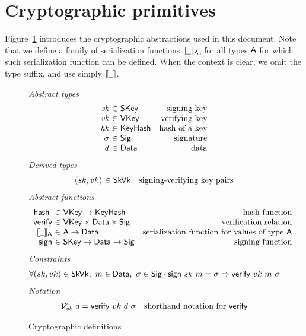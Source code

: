 \section{Cryptographic primitives}
\label{sec:crypto-primitives}

Figure~\ref{fig:crypto-defs} introduces the cryptographic abstractions used in
this document. Note that we define a family of serialization functions
$\serialised{\wcard}_\type{A}$, for all types $\mathsf{A}$ for which such
serialization function can be defined. When the context is clear, we omit the
type suffix, and use simply $\serialised{\wcard}$.

\begin{figure}[htb]
  \emph{Abstract types}
  \begin{equation*}
    \begin{array}{r@{~\in~}lr}
      \var{sk} & \SKey & \text{signing key}\\
      \var{vk} & \VKey & \text{verifying key}\\
      \var{hk} & \KeyHash & \text{hash of a key}\\
      \sigma & \Sig  & \text{signature}\\
      \var{d} & \Data  & \text{data}\\
    \end{array}
  \end{equation*}
  \emph{Derived types}
  \begin{equation*}
    \begin{array}{r@{~\in~}lr}
      (sk, vk) & \SkVk & \text{signing-verifying key pairs}
    \end{array}
  \end{equation*}
  \emph{Abstract functions}
  \begin{equation*}
    \begin{array}{r@{~\in~}lr}
      \hash{} & \VKey \to \KeyHash
      & \text{hash function} \\
      \fun{verify} & \VKey \times \Data \times \Sig
      & \text{verification relation}\\
      \serialised{\wcard}_\type{A} & \type{A} \to \Data
      & \text{serialization function for values of type $\type{A}$}\\
      \fun{sign} & \SKey \to \Data \to \Sig
      & \text{signing function}
    \end{array}
  \end{equation*}
  \emph{Constraints}
  \begin{align*}
    & \forall (sk, vk) \in \mathsf{SkVk},~ m \in \mathsf{Data},~ \sigma \in \mathsf{Sig} \cdot
      \mathsf{sign} ~ sk ~ m = \sigma \Rightarrow \mathsf{verify} ~ vk ~ m ~ \sigma
  \end{align*}
  \emph{Notation}
  \begin{align*}
    & \mathcal{V}^\sigma_{\mathit{vk}}~{d} = \mathsf{verify} ~ vk ~ d ~ \sigma
      & \text{shorthand notation for } \mathsf{verify}
  \end{align*}
  \caption{Cryptographic definitions}
  \label{fig:crypto-defs}
\end{figure}

